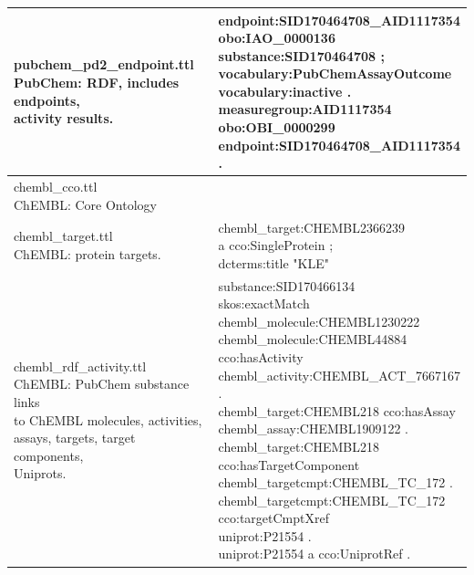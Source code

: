 \begin{singlespace}
\begin{longtable}{p{0.5\linewidth}p{0.5\linewidth}}
\hline
\makecell[l]{pubchem\_pd2\_endpoint.ttl\\ PubChem: RDF, includes endpoints,\\ activity results.} & \makecell[l]{endpoint:SID170464708\_AID1117354\\ obo:IAO\_0000136 substance:SID170464708 ;\\ vocabulary:PubChemAssayOutcome\\ vocabulary:inactive .\\ measuregroup:AID1117354\\ obo:OBI\_0000299\\ endpoint:SID170464708\_AID1117354 .}\\
\hline
\makecell[l]{chembl\_cco.ttl\\ ChEMBL: Core Ontology} &\\
\hline
\makecell[l]{chembl\_target.ttl\\ ChEMBL: protein targets.} & \makecell[l]{chembl\_target:CHEMBL2366239\\ a cco:SingleProtein ;\\ dcterms:title "KLE"}\\
\hline
\makecell[l]{chembl\_rdf\_activity.ttl\\ ChEMBL: PubChem substance links\\ to ChEMBL molecules, activities,\\ assays, targets, target components,\\ Uniprots.} & \makecell[l]{substance:SID170466134\\ skos:exactMatch\\ chembl\_molecule:CHEMBL1230222\\ chembl\_molecule:CHEMBL44884\\ cco:hasActivity\\ chembl\_activity:CHEMBL\_ACT\_7667167 .\\ chembl\_target:CHEMBL218 cco:hasAssay\\
chembl\_assay:CHEMBL1909122 .\\ chembl\_target:CHEMBL218\\
cco:hasTargetComponent\\ chembl\_targetcmpt:CHEMBL\_TC\_172 .\\ chembl\_targetcmpt:CHEMBL\_TC\_172\\ cco:targetCmptXref\\ uniprot:P21554 .\\ uniprot:P21554 a cco:UniprotRef .}\\
\hline
\end{longtable}
\end{singlespace}

